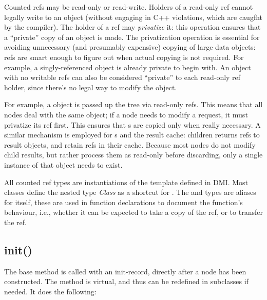   Counted refs may be read-only or read-write. Holders of a read-only ref
  cannot legally write to an object (without engaging in C++ 
  violations, which are caugfht by the compiler). The holder of a ref may  {\em
  privatize} it: this operation ensures that a ``private'' copy of an object is
  made. The privatization operation is essential for avoiding unnecessary (and
  presumably expensive) copying of large data objects: refs are smart enough to
  figure out when actual copying is not required. For example, a
  singly-referenced object is already private to begin with. An object with no
  writable refs can also be considered ``private'' to each read-only ref holder,
  since there's no legal way to modify the object.
  
  For example, a  object is passed up the tree via read-only refs.
  This means that all nodes deal with the same object; if a node needs to
  modify a request, it must privatize its ref first. This ensures that
  s are copied only when really necessary. A similar mechanism is
  employed for s and the result cache: children returns refs to
  result objects, and retain refs in their cache. Because most nodes do not
  modify child results, but rather process them as read-only before discarding,
  only a single instance of that  object needs to exist.

  All counted ref types are instantiations of the  template
  defined in DMI. Most classes define the nested type {\sl Class} as
  a shortcut for . The  and
   types are aliases for  itself, these are used in
  function declarations to document the function's behaviour, i.e., whether it
  can be expected to take a copy of the ref, or to transfer the ref.

\subsection{init()}

  The base  method is called with an init-record, directly
  after a node has been constructed. The method is virtual, and thus can be
  redefined in subclasses if needed. It does the following:

